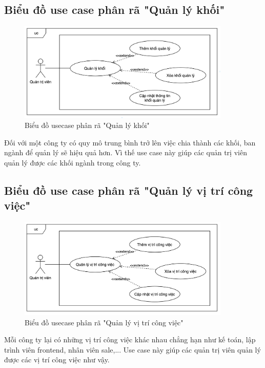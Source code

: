\documentclass[../DoAn.tex]{subfiles}
\begin{document}
\subsection{Biểu đồ use case phân rã "Quản lý khối"}
\label{subsection:2.2.5}
\begin{figure}[H]
    \centering
    \includegraphics[width=0.9\textwidth]{Hinhve/UC_QuanLyKhoi.png}
    \caption{Biểu đồ usecase phân rã "Quản lý khối"}
\end{figure}
Đối với một công ty có quy mô trung bình trở lên việc chia thành các khối, ban ngành để quản lý sẽ hiệu quả hơn. Vì thế use case này giúp các quản trị viên quản lý được các khối ngành trong công ty.

\subsection{Biểu đồ use case phân rã "Quản lý vị trí công việc"}
\label{subsection:2.2.6}
\begin{figure}[H]
    \centering
    \includegraphics[width=0.9\textwidth]{Hinhve/UC_QuanLyViTriCongViec.png}
    \caption{Biểu đồ usecase phân rã "Quản lý vị trí công việc"}
\end{figure}
Mỗi công ty lại có những vị trí công việc khác nhau chẳng hạn như kế toán, lập trình viên frontend, nhân viên sale,... Use case này giúp các quản trị viên quản lý được các vị trí công việc như vậy.
\end{document}
